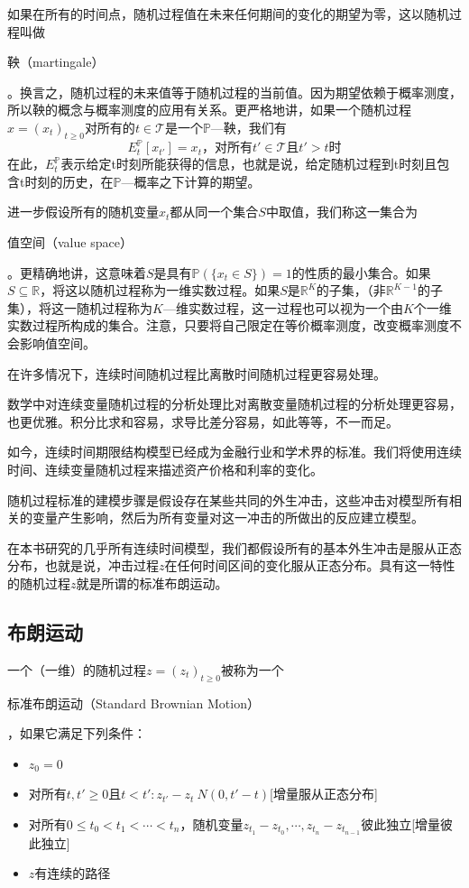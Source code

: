 \documentclass[UTF8]{ctexart}
\newcommand \qd[1] {\begin{qds} {#1} \end{qds}}
\begin{document}
如果在所有的时间点，随机过程值在未来任何期间的变化的期望为零，这以随机过程叫做\qd{鞅（martingale）}。换言之，随机过程的未来值等于随机过程的当前值。因为期望依赖于概率测度，所以鞅的概念与概率测度的应用有关系。更严格地讲，如果一个随机过程$x=(x_t)_{t \geqslant 0}$对所有的$t \in \mathscr{T}$是一个$\mathbb{P}$---鞅，我们有
$$E_t^\mathbb{P}[x_{t'}]=x_t \text{，对所有}t' \in \mathscr{T} \text{且} t'>t \text{时}$$
在此，$E_t^\mathbb{P}$表示给定t时刻所能获得的信息，也就是说，给定随机过程到t时刻且包含t时刻的历史，在$\mathbb{P}$---概率之下计算的期望。

进一步假设所有的随机变量$x_t$都从同一个集合$S$中取值，我们称这一集合为\qd{值空间（value space）}。更精确地讲，这意味着$S$是具有$\mathbb{P}(\{x_t \in S\})=1$的性质的最小集合。如果$S \subseteq \mathbb{R}$，将这以随机过程称为一维实数过程。如果$S$是$\mathbb{R}^K$的子集，（非$\mathbb{R}^{K-1}$的子集），将这一随机过程称为$K$---维实数过程，这一过程也可以视为一个由$K$个一维实数过程所构成的集合。注意，只要将自己限定在等价概率测度，改变概率测度不会影响值空间。

在许多情况下，连续时间随机过程比离散时间随机过程更容易处理。

数学中对连续变量随机过程的分析处理比对离散变量随机过程的分析处理更容易，也更优雅。积分比求和容易，求导比差分容易，如此等等，不一而足。

如今，连续时间期限结构模型已经成为金融行业和学术界的标准。我们将使用连续时间、连续变量随机过程来描述资产价格和利率的变化。

随机过程标准的建模步骤是假设存在某些共同的外生冲击，这些冲击对模型所有相关的变量产生影响，然后为所有变量对这一冲击的所做出的反应建立模型。

在本书研究的几乎所有连续时间模型，我们都假设所有的基本外生冲击是服从正态分布，也就是说，冲击过程$z$在任何时间区间的变化服从正态分布。具有这一特性的随机过程$z$就是所谓的标准布朗运动。

\subsection{布朗运动}

一个（一维）的随机过程$z=(z_t)_{t \geqslant 0}$被称为一个\qd{标准布朗运动（Standard Brownian Motion）}，如果它满足下列条件：
\begin{itemize}
    \item{$z_0=0$}
    \item{对所有$t,t' \geqslant 0 \text{且} t<t':z_{t'}-z_t~N(0,t'-t)$[增量服从正态分布]}
    \item{对所有$0 \leqslant t_0 < t_1 < \cdots < t_n$，随机变量$z_{t_1}-z_{t_0},\cdots,z_{t_n}-z_{t_{n-1}}$彼此独立[增量彼此独立]}
    \item{$z$有连续的路径}
\end{itemize}
\end{document}
